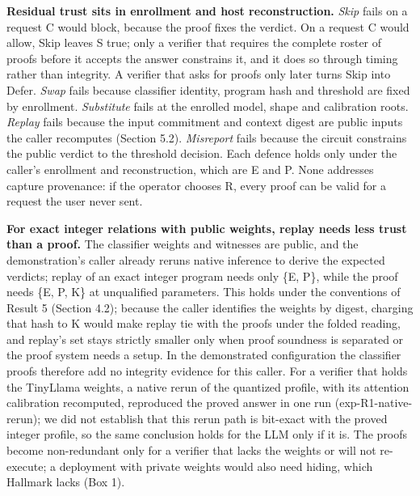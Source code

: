 \documentclass[11pt]{article}
\begin{document}
\textbf{Residual trust sits in enrollment and host reconstruction.} \emph{Skip} fails on a request C would block, because the proof fixes the verdict. On a request C would allow, Skip leaves S true; only a verifier that requires the complete roster of proofs before it accepts the answer constrains it, and it does so through timing rather than integrity. A verifier that asks for proofs only later turns Skip into Defer. \emph{Swap} fails because classifier identity, program hash and threshold are fixed by enrollment. \emph{Substitute} fails at the enrolled model, shape and calibration roots. \emph{Replay} fails because the input commitment and context digest are public inputs the caller recomputes (Section 5.2). \emph{Misreport} fails because the circuit constrains the public verdict to the threshold decision. Each defence holds only under the caller's enrollment and reconstruction, which are E and P. None addresses capture provenance: if the operator chooses R, every proof can be valid for a request the user never sent.

\textbf{For exact integer relations with public weights, replay needs less trust than a proof.} The classifier weights and witnesses are public, and the demonstration's caller already reruns native inference to derive the expected verdicts; replay of an exact integer program needs only \{E, P\}, while the proof needs \{E, P, K\} at unqualified parameters. This holds under the conventions of Result 5 (Section 4.2); because the caller identifies the weights by digest, charging that hash to K would make replay tie with the proofs under the folded reading, and replay's set stays strictly smaller only when proof soundness is separated or the proof system needs a setup. In the demonstrated configuration the classifier proofs therefore add no integrity evidence for this caller. For a verifier that holds the TinyLlama weights, a native rerun of the quantized profile, with its attention calibration recomputed, reproduced the proved answer in one run (exp-R1-native-rerun); we did not establish that this rerun path is bit-exact with the proved integer profile, so the same conclusion holds for the LLM only if it is. The proofs become non-redundant only for a verifier that lacks the weights or will not re-execute; a deployment with private weights would also need hiding, which Hallmark lacks (Box 1).
\end{document}
